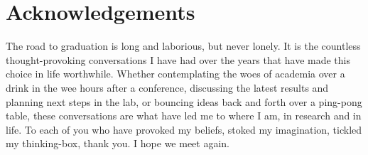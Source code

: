 
\chapter*{Acknowledgements}

The road to graduation is long and laborious, but never lonely.
It is the countless thought-provoking conversations I have had over the years that have made this choice in life worthwhile. Whether contemplating the woes of academia over a drink in the wee hours after a conference, discussing the latest results and planning next steps in the lab, or bouncing ideas back and forth over a ping-pong table, these conversations are what have led me to where I am, in research and in life. To each of you who have provoked my beliefs, stoked my imagination, tickled my thinking-box, thank you. I hope we meet again.